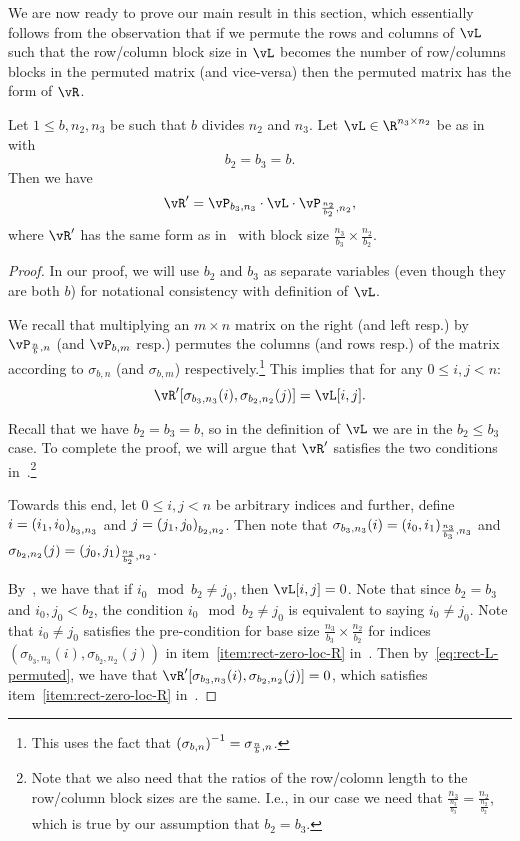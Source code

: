 We are now ready to prove our main result in this section, which essentially follows from the observation that if we permute the rows and columns of $\vL$ such that the row/column block size in $\vL$ becomes the number of row/columns blocks in the permuted matrix (and vice-versa) then the permuted matrix has the form of $\vR$.


\begin{theorem} Let $1\le b,n_2,n_3$ be such that $b$ divides $n_2$ and $n_3$.
Let $\vL\in\R^{n_3\times n_2}$ be as in~ with 
\[b_2=b_3=b.\] 
Then we have
\[\vR'=\vP_{b_3,n_3}\cdot\vL\cdot\vP_{\frac {n_2}{b_2},n_2},\]
where $\vR'$ has the same form as in~ with block size $\frac{n_3}{b_3} \times \frac{n_2}{b_2}$.
\end{theorem}


\begin{proof}
In our proof, we will use $b_2$ and $b_3$ as separate variables (even though they are both $b$) for notational consistency with definition of $\vL$.

We recall  that multiplying an $m\times n$ matrix on the right (and left resp.) by $\vP_{\frac nb,n}$ (and $\vP_{b,m}$ resp.) permutes the columns (and rows resp.) of the matrix according to $\sigma_{b,n}$ (and $\sigma_{b,m}$) respectively.\footnote{This uses the fact that $\left( {\sigma_{b,n}}\right)^{-1}=\sigma_{\frac nb,n}$.} This implies that for any $0\le i,j<n$:
\begin{equation}
\label{eq:rect-L-permuted}
\vR'[\sigma_{b_3,n_3}(i),\sigma_{b_2,n_2}(j)]=\vL[i,j].
\end{equation}


Recall that we have $b_2=b_3=b$, so in the definition of $\vL$  we are in the $b_2 \le b_3$ case.
To complete the proof, we will argue that $\vR'$ satisfies the two conditions in~.\footnote{Note that we also need that the ratios of the row/colomn length to the row/column block sizes are the same. I.e., in our case we need that $\frac{n_3}{\frac{n_3}{b_3}}=\frac{n_2}{\frac{n_2}{b_2}}$, which is true by our assumption that $b_2=b_3$.}

Towards this end, let $0\le i,j<n$ be arbitrary indices and further, define $i=\left( {{i_1},{i_0}}\right)_{{b_3,n_3}}$ and $j=\left( {{j_1},{j_0}}\right)_{{b_2,n_2}}$. Then note that $\sigma_{b_3,n_3}(i)=\left( {{i_0},{i_1}}\right)_{{\frac {n_3}{b_3},n_3}}$ and $\sigma_{b_2,n_2}(j)=\left( {{j_0},{j_1}}\right)_{{\frac {n_2}{b_2},n_2}}$.

By~, we have that if $i_0\mod{b_2}\ne j_0$, then $\vL[i,j]=0$. Note  that since $b_2=b_3$ and $i_0,j_0<b_2$, the condition $i_0\mod{b_2}\ne j_0$ is equivalent to saying $i_0\ne j_0$. Note that $i_0\ne j_0$ satisfies the pre-condition for base size $\frac {n_3}{b_3}\times \frac{n_2}{b_2}$ for indices $(\sigma_{b_3,n_3}(i),\sigma_{b_2,n_2}(j))$ in item~\ref{item:rect-zero-loc-R} in~.  Then   by~\cref{eq:rect-L-permuted}, we have that $\vR'[\sigma_{b_3,n_3}(i),\sigma_{b_2,n_2}(j)]=0$, which satisfies item~\ref{item:rect-zero-loc-R} in~.


\end{proof}
